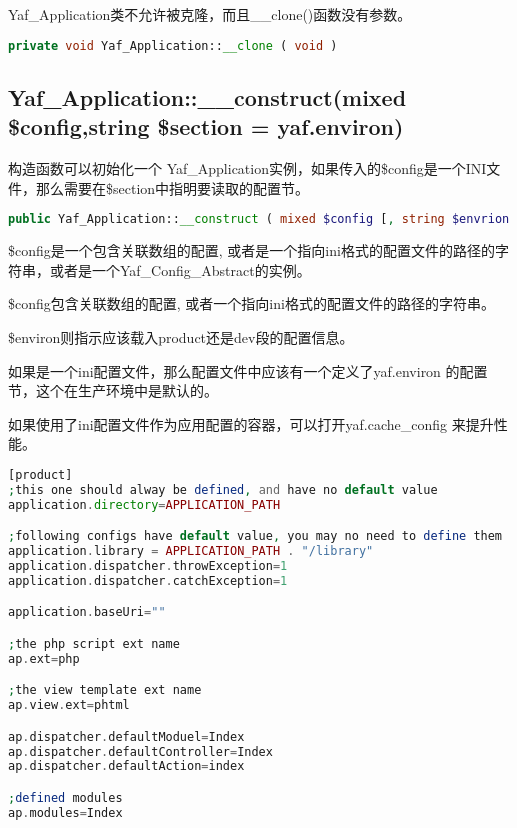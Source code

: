 Yaf\_Application类不允许被克隆，而且\_\_clone()函数没有参数。






\begin{lstlisting}[language=PHP]
private void Yaf_Application::__clone ( void )
\end{lstlisting}





\subsection{Yaf\_Application::\_\_construct(mixed \$config,string \$section = yaf.environ)}

构造函数可以初始化一个 Yaf\_Application实例，如果传入的\$config是一个INI文件，那么需要在\$section中指明要读取的配置节。




\begin{lstlisting}[language=PHP]
public Yaf_Application::__construct ( mixed $config [, string $envrion ] )
\end{lstlisting}

\$config是一个包含关联数组的配置, 或者是一个指向ini格式的配置文件的路径的字符串，或者是一个Yaf\_Config\_Abstract的实例。

\begin{compactitem}
\item \$config包含关联数组的配置, 或者一个指向ini格式的配置文件的路径的字符串。
\item \$environ则指示应该载入product还是dev段的配置信息。
\end{compactitem}




如果是一个ini配置文件，那么配置文件中应该有一个定义了yaf.environ 的配置节，这个在生产环境中是默认的。

如果使用了ini配置文件作为应用配置的容器，可以打开yaf.cache\_config 来提升性能。

\begin{lstlisting}[language=PHP]
[product]
;this one should alway be defined, and have no default value
application.directory=APPLICATION_PATH

;following configs have default value, you may no need to define them
application.library = APPLICATION_PATH . "/library"
application.dispatcher.throwException=1
application.dispatcher.catchException=1

application.baseUri=""

;the php script ext name
ap.ext=php

;the view template ext name
ap.view.ext=phtml

ap.dispatcher.defaultModuel=Index
ap.dispatcher.defaultController=Index
ap.dispatcher.defaultAction=index

;defined modules
ap.modules=Index
\end{lstlisting}


